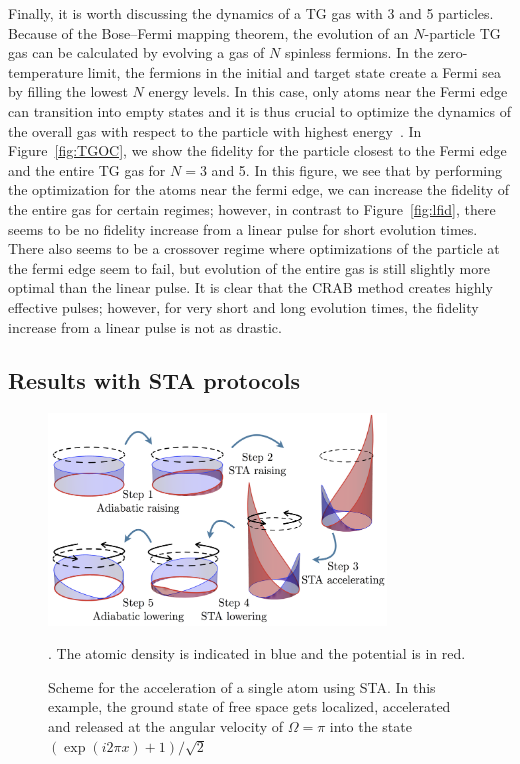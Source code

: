 Finally, it is worth discussing the dynamics of a TG gas with 3 and 5 particles.
Because of the Bose--Fermi mapping theorem, the evolution of an $N$-particle TG gas can be calculated by evolving a gas of $N$ spinless fermions.
In the zero-temperature limit, the fermions in the initial and target state create a Fermi sea by filling the lowest $N$ energy levels.
In this case, only atoms near the Fermi edge can transition into empty states and it is thus crucial to optimize the dynamics of the overall gas with respect to the particle with highest energy~\cite{garaot2015}.
In Figure~\ref{fig:TGOC}, we show the fidelity for the particle closest to the Fermi edge and the entire TG gas for $N=3$ and 5.
In this figure, we see that by performing the optimization for the atoms near the fermi edge, we can increase the fidelity of the entire gas for certain regimes; however, in contrast to Figure~\ref{fig:lfid}, there seems to be no fidelity increase from a linear pulse for short evolution times.
There also seems to be a crossover regime where optimizations of the particle at the fermi edge seem to fail, but evolution of the entire gas is still slightly more optimal than the linear pulse.
It is clear that the CRAB method creates highly effective pulses; however, for very short and long evolution times, the fidelity increase from a linear pulse is not as drastic.

\subsection{Results with STA protocols}

\begin{figure}
\centering
\includegraphics[width=0.8\textwidth]{data/1d/STAscheme.png} 
\caption{Scheme for the acceleration of a single atom using STA.
 In this example, the ground state of free space gets localized, accelerated and released at the angular velocity of $\Omega=\pi$ into the state
 $\left( \exp(i 2\pi x) +1 \right) /\sqrt 2$}.
 The atomic density is indicated in blue and the potential is in red.
\label{fig:STA-scheme}
\end{figure}


